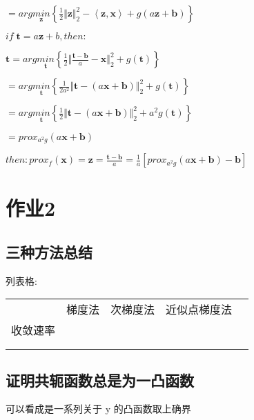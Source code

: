 \documentclass[12pt, a4paper, oneside, fontset=windows]{ctexart}
\begin{document}
$=arg\underset{\mathbf z}{min}\left \{ \frac{1}{2}\Vert \mathbf z \Vert _2^{2}-\left \langle \mathbf z ,\mathbf x \right \rangle+g\left (a\mathbf z+\mathbf b \right )\right \}$

$if \;\mathbf t=a\mathbf z+b,then:$

$\mathbf t=arg\underset{\mathbf t}{min}\left \{ \frac{1}{2}\Vert \frac{\mathbf t-\mathbf b}{a} - \mathbf x \Vert _2^{2}+g \left (\mathbf t \right )\right \}$

$=arg\underset{\mathbf t}{min}\left \{ \frac{1}{2a^{2}}\Vert \mathbf t - \left ( a\mathbf x +\mathbf b \right )\Vert _2^{2}+g \left (\mathbf t \right )\right \}$

$=arg\underset{\mathbf t}{min}\left \{ \frac{1}{2}\Vert \mathbf t - \left ( a\mathbf x +\mathbf b \right )\Vert _2^{2}+a^{2}g \left (\mathbf t \right )\right \}$

$=prox_{a^{2}g}\left ( a\mathbf x+\mathbf b\right )$

$then:prox_{f}\left ( \mathbf x \right )=\mathbf z=\frac{\mathbf t-\mathbf b}{a}=\frac{1}{a}\left [prox_{a^{2}g}\left ( a\mathbf x+\mathbf b\right )-\mathbf b  \right ]$

\newpage
\section{作业2}

\subsection{三种方法总结}

列表格:

\begin{table}[h]
    \begin{tabular}{|l|l|l|l|l}
    \cline{1-4}
         & 梯度法 & 次梯度法 & 近似点梯度法 &  \\ \cline{1-4}
    收敛速率 &     &      &        &  \\ \cline{1-4}
         &     &      &        &  \\ \cline{1-4}
         &     &      &        &  \\ \cline{1-4}
    \end{tabular}
    \end{table}

\subsection{证明共轭函数总是为一凸函数}
可以看成是一系列关于 y 的凸函数取上确界
\end{document}
